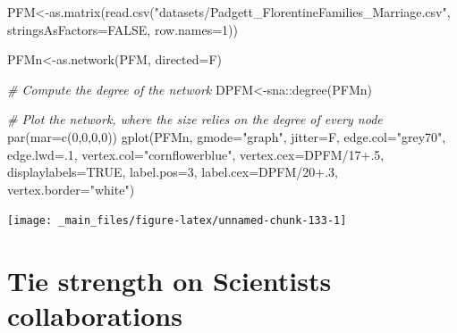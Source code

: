 \documentclass[
  notitlepage,
  onecolumn,
  openany]{book}
\newenvironment{Shaded}{\begin{snugshade}}{\end{snugshade}}
\newcommand{\AttributeTok}[1]{\textcolor[rgb]{0.77,0.63,0.00}{#1}}
\newcommand{\CommentTok}[1]{\textcolor[rgb]{0.56,0.35,0.01}{\textit{#1}}}
\newcommand{\ConstantTok}[1]{\textcolor[rgb]{0.00,0.00,0.00}{#1}}
\newcommand{\DecValTok}[1]{\textcolor[rgb]{0.00,0.00,0.81}{#1}}
\newcommand{\FloatTok}[1]{\textcolor[rgb]{0.00,0.00,0.81}{#1}}
\newcommand{\FunctionTok}[1]{\textcolor[rgb]{0.00,0.00,0.00}{#1}}
\newcommand{\NormalTok}[1]{#1}
\newcommand{\OtherTok}[1]{\textcolor[rgb]{0.56,0.35,0.01}{#1}}
\newcommand{\SpecialCharTok}[1]{\textcolor[rgb]{0.00,0.00,0.00}{#1}}
\newcommand{\StringTok}[1]{\textcolor[rgb]{0.31,0.60,0.02}{#1}}
\begin{document}
\begin{Shaded}
\begin{Highlighting}[]
\NormalTok{PFM}\OtherTok{\textless{}{-}}\FunctionTok{as.matrix}\NormalTok{(}\FunctionTok{read.csv}\NormalTok{(}\StringTok{"datasets/Padgett\_FlorentineFamilies\_Marriage.csv"}\NormalTok{,}
                        \AttributeTok{stringsAsFactors=}\ConstantTok{FALSE}\NormalTok{, }\AttributeTok{row.names=}\DecValTok{1}\NormalTok{))}

\NormalTok{PFMn}\OtherTok{\textless{}{-}}\FunctionTok{as.network}\NormalTok{(PFM, }\AttributeTok{directed=}\NormalTok{F)}

\CommentTok{\# Compute the degree of the network}
\NormalTok{DPFM}\OtherTok{\textless{}{-}}\NormalTok{sna}\SpecialCharTok{::}\FunctionTok{degree}\NormalTok{(PFMn)}

\CommentTok{\# Plot the network, where the size relies on the degree of every node}
\FunctionTok{par}\NormalTok{(}\AttributeTok{mar=}\FunctionTok{c}\NormalTok{(}\DecValTok{0}\NormalTok{,}\DecValTok{0}\NormalTok{,}\DecValTok{0}\NormalTok{,}\DecValTok{0}\NormalTok{))}
\FunctionTok{gplot}\NormalTok{(PFMn, }
      \AttributeTok{gmode=}\StringTok{"graph"}\NormalTok{, }
      \AttributeTok{jitter=}\NormalTok{F,}
      \AttributeTok{edge.col=}\StringTok{"grey70"}\NormalTok{,}
      \AttributeTok{edge.lwd=}\NormalTok{.}\DecValTok{1}\NormalTok{, }
      \AttributeTok{vertex.col=}\StringTok{"cornflowerblue"}\NormalTok{,}
      \AttributeTok{vertex.cex=}\NormalTok{DPFM}\SpecialCharTok{/}\DecValTok{17}\FloatTok{+.5}\NormalTok{,}
      \AttributeTok{displaylabels=}\ConstantTok{TRUE}\NormalTok{, }
      \AttributeTok{label.pos=}\DecValTok{3}\NormalTok{, }
      \AttributeTok{label.cex=}\NormalTok{DPFM}\SpecialCharTok{/}\DecValTok{20}\FloatTok{+.3}\NormalTok{, }
      \AttributeTok{vertex.border=}\StringTok{"white"}\NormalTok{)}
\end{Highlighting}
\end{Shaded}

\begin{center}\texttt{[image: \_main\_files/figure-latex/unnamed-chunk-133-1]} \end{center}

\hypertarget{tie-strength-on-scientists-collaborations}{%
\section{Tie strength on Scientists collaborations}\label{tie-strength-on-scientists-collaborations}}
\end{document}
